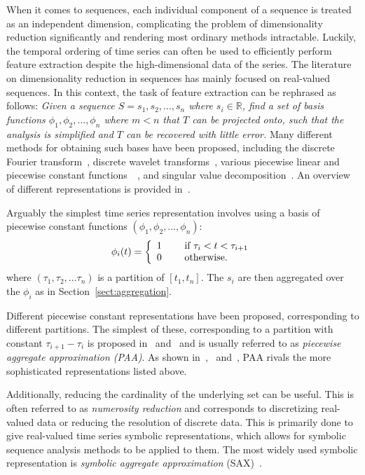 When it comes to sequences, each individual component of a sequence is treated as an independent dimension, complicating the problem of dimensionality reduction significantly and rendering most ordinary methods intractable. Luckily, the temporal ordering of time series can often be used to efficiently perform feature extraction despite the high-dimensional data of the series. The literature on dimensionality reduction in sequences has mainly focused on real-valued sequences. In this context, the task of feature extraction can be rephrased as follows: \emph{Given a sequence $S = s_1, s_2, \dots, s_n$ where $s_i \in \mathbb{R}$, find a set of basis functions $\phi_1, \phi_2, \dots, \phi_n$ where $m < n$ that $T$ can be projected onto, such that the analysis is simplified and $T$ can be recovered with little error.} Many different methods for obtaining such bases have been proposed, including the discrete Fourier transform~\cite{faloutsos1}, discrete wavelet transforms~\cite{pong}, various piecewise linear and piecewise constant functions~\cite{keogh3}~\cite{geurts}, and singular value decomposition~\cite{keogh3}. An overview of different representations is provided in~\cite{fabian}.

Arguably the simplest time series representation involves using a basis of piecewise constant functions $(\phi_1, \phi_2, \dots, \phi_n)$:
\[
  \phi_i(t) = \left\{
    \begin{array}{l l}
      1 & \quad \text{ if } \tau_i < t < \tau_{i+1} \\
      0 & \quad \text{ otherwise.} \\
    \end{array} \right.
\]
where $(\tau_1, \tau_2, \dots \tau_n)$ is a partition of $[t_1, t_n]$. The $s_i$ are then aggregated over the $\phi_i$ as in Section~\ref{sect:aggregation}.

Different piecewise constant representations have been proposed, corresponding to different partitions. The simplest of these, corresponding to a partition with constant $\tau_{i+1} - \tau_i$ is proposed in~\cite{keogh4} and~\cite{faloutsos2} and is usually referred to as \emph{piecewise aggregate approximation (PAA)}. As shown in~\cite{keogh5},~\cite{keogh3} and~\cite{faloutsos2}, PAA rivals the more sophisticated representations listed above.

Additionally, reducing the cardinality of the underlying set can be useful. This is often referred to as \emph{numerosity reduction} and corresponds to discretizing real-valued data or reducing the resolution of discrete data. This is primarily done to give real-valued time series symbolic representations, which allows for symbolic sequence analysis methods to be applied to them. The most widely used symbolic representation is \emph{symbolic aggregate approximation} (SAX)~\cite{sax}.

